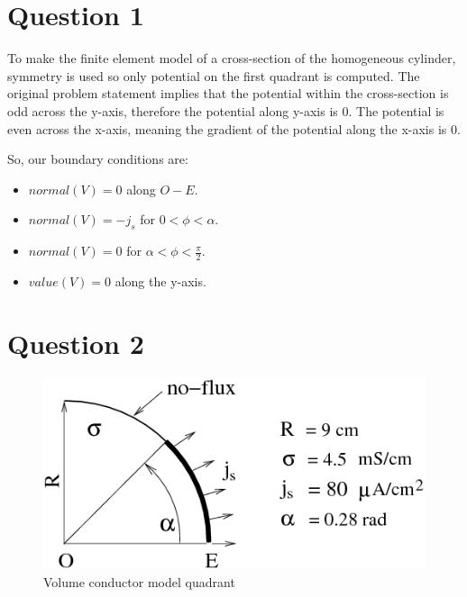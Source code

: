\documentclass{article}
\author{Allen Yin}
\begin{document}
\maketitle
\setlength\parskip{0.1in}

\section{Question 1}
To make the finite element model of a cross-section of the homogeneous cylinder, symmetry is used so only potential on the first quadrant is computed. The original problem statement implies that the potential within the cross-section is odd across the y-axis, therefore the potential along y-axis is 0. The potential is even across the x-axis, meaning the gradient of the potential along the x-axis is 0.

So, our boundary conditions are:
\begin{itemize}
    \item $normal(V)=0$ along $O-E$.
    \item $normal(V)=-j_s$ for $0<\phi<\alpha$.
    \item $normal(V)=0$ for $\alpha<\phi<\frac{\pi}{2}$.
    \item $value(V)=0$ along the y-axis.
\end{itemize}

\section{Question 2}
\begin{figure}[H]
    \begin{center}
    \includegraphics[scale=1]{quadrant.png}
    \caption{Volume conductor model quadrant}
\end{center}
\end{figure}
\end{document}
